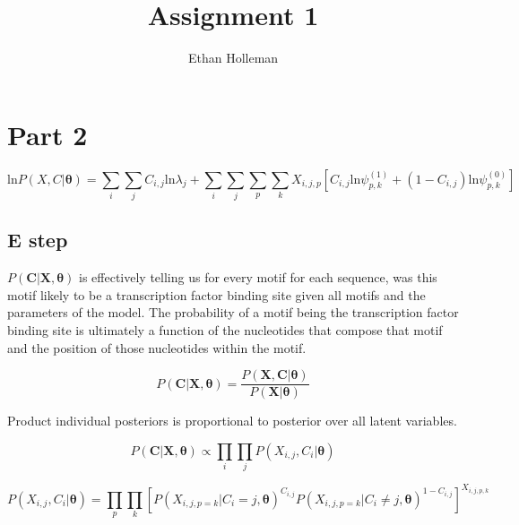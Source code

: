 \documentclass[12pt]{article}
\theoremstyle{definition}
\begin{document}
\title{
	Assignment 1}

\author{Ethan Holleman}
\maketitle

\section{Part 2}


\begin{equation}
	\textrm{ln}P(X, C | \boldsymbol{\theta}) = \sum_{i} \sum_{j} C_{i, j} \textrm{ln}\lambda_{j} + \sum_{i}\sum_{j}\sum_{p}\sum_{k} X_{i,j,p}[C_{i,j}\textrm{ln} \psi^{(1)}_{p, k} + (1 - C_{i,j})\textrm{ln}\psi^{(0)}_{p, k}]
\end{equation}

\subsection{E step}

$P(\boldsymbol{C} | \boldsymbol{X}, \boldsymbol{\theta})$ is effectively telling us for every motif for each sequence, was this motif likely to be a transcription factor binding site given all motifs and the parameters of the model. The probability of a motif being the transcription factor binding site is ultimately a function of the nucleotides that compose that motif and the position of those nucleotides within the motif.

\begin{equation}
	P(\boldsymbol{C} | \boldsymbol{X}, \boldsymbol{\theta}) = \frac{P(\boldsymbol{X}, \boldsymbol{C} | \boldsymbol{\theta})}{P(\boldsymbol{X} | \boldsymbol{\theta})}
\end{equation}

Product individual posteriors is proportional to posterior over all latent variables.

\begin{equation}
P(\boldsymbol{C} | \boldsymbol{X}, \boldsymbol{\theta}) \propto
 \prod_{i} \prod_{j} P( X_{i, j}, C_{i} | \boldsymbol{\theta})
\end{equation}

\begin{equation}
P( X_{i, j}, C_{i} | \boldsymbol{\theta}) = \prod_{p}\prod_{k}[P(X_{i,j,p=k} | C_{i}=j, \boldsymbol{\theta})^{C_{i,j}}P(X_{i,j,p=k} | C_{i}\neq j, \boldsymbol{\theta})^{1-C_{i,j}}]^{X_{i,j,p,k}}
\end{equation}
\end{document}
